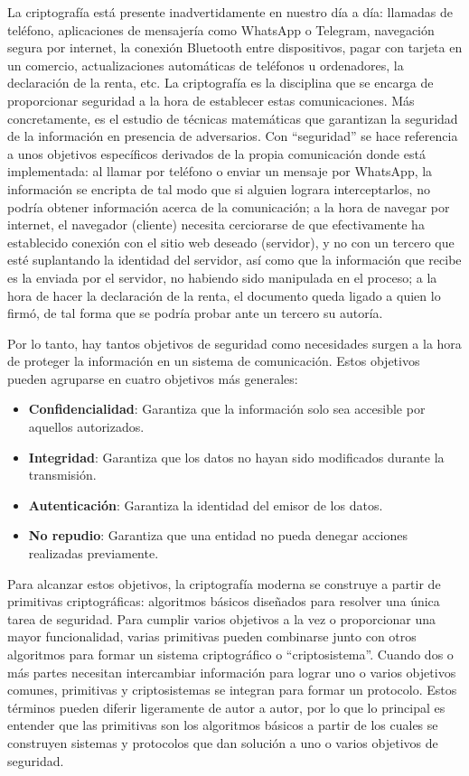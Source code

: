 La criptografía está presente inadvertidamente en nuestro día a día: llamadas de teléfono, aplicaciones de mensajería como WhatsApp o Telegram, navegación segura por internet, la conexión Bluetooth entre dispositivos, pagar con tarjeta en un comercio, actualizaciones automáticas de teléfonos u ordenadores, la declaración de la renta, etc. La criptografía es la disciplina que se encarga de proporcionar seguridad a la hora de establecer estas comunicaciones. Más concretamente, es el estudio de técnicas matemáticas que garantizan la seguridad de la información en presencia de adversarios. Con ``seguridad'' se hace referencia a unos objetivos específicos derivados de la propia comunicación donde está implementada: al llamar por teléfono o enviar un mensaje por WhatsApp, la información se encripta de tal modo que si alguien lograra interceptarlos, no podría obtener información acerca de la comunicación; a la hora de navegar por internet, el navegador (cliente) necesita cerciorarse de que efectivamente ha establecido conexión con el sitio web deseado (servidor), y no con un tercero que esté suplantando la identidad del servidor, así como que la información que recibe es la enviada por el servidor, no habiendo sido manipulada en el proceso; a la hora de hacer la declaración de la renta, el documento queda ligado a quien lo firmó, de tal forma que se podría probar ante un tercero su autoría.

Por lo tanto, hay tantos objetivos de seguridad como necesidades surgen a la hora de proteger la información en un sistema de comunicación. Estos objetivos pueden agruparse en cuatro objetivos más generales:

\begin{itemize}
	\item \textbf{Confidencialidad}: Garantiza que la información solo sea accesible por aquellos autorizados.
	\item \textbf{Integridad}: Garantiza que los datos no hayan sido modificados durante la transmisión.
	\item \textbf{Autenticación}: Garantiza la identidad del emisor de los datos.
	\item \textbf{No repudio}: Garantiza que una entidad no pueda denegar acciones realizadas previamente.
\end{itemize}

Para alcanzar estos objetivos, la criptografía moderna se construye a partir de primitivas criptográficas: algoritmos básicos diseñados para resolver una única tarea de seguridad. Para cumplir varios objetivos a la vez o proporcionar una mayor funcionalidad, varias primitivas pueden combinarse junto con otros algoritmos para formar un sistema criptográfico o ``criptosistema''. Cuando dos o más partes necesitan intercambiar información para lograr uno o varios objetivos comunes, primitivas y criptosistemas se integran para formar un protocolo. Estos términos pueden diferir ligeramente de autor a autor, por lo que lo principal es entender que las primitivas son los algoritmos básicos a partir de los cuales se construyen sistemas y protocolos que dan solución a uno o varios objetivos de seguridad. 

